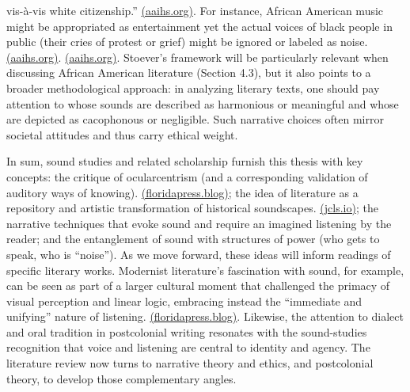 \documentclass[12pt]{report}
\begin{document}
vis-à-vis white citizenship.” \href{https://www.aaihs.org/the-sonic-color-line-black-women-and-police-violence/#:~:text=aural%20border%20between%20white%20people,call%20the%20sonic%20color%20line}{(aaihs.org)}. For instance, African American music might be appropriated as entertainment yet the actual voices of black people in public (their cries of protest or grief) might be ignored or labeled as noise. \href{https://www.aaihs.org/the-sonic-color-line-black-women-and-police-violence/#:~:text=presence%20%20of%20a%20long,call%20the%20sonic%20color%20line}{(aaihs.org)}. \href{https://www.aaihs.org/the-sonic-color-line-black-women-and-police-violence/#:~:text=The%20patroller%E2%80%99s%20deliberate%20tone%20ensures,European%20musical%20concepts%20of%20the}{(aaihs.org)}. Stoever’s framework will be particularly relevant when discussing African American literature (Section 4.3), but it also points to a broader methodological approach: in analyzing literary texts, one should pay attention to whose sounds are described as harmonious or meaningful and whose are depicted as cacophonous or negligible. Such narrative choices often mirror societal attitudes and thus carry ethical weight.

In sum, sound studies and related scholarship furnish this thesis with key concepts: the critique of ocularcentrism (and a corresponding validation of auditory ways of knowing). \href{https://floridapress.blog/2018/12/04/modernist-soundscapes/#:~:text=These%20writers%20challenged%20ocularcentrism%2C%20the,the%20course%20of%20contemporary%20literature}{(floridapress.blog)}; the idea of literature as a repository and artistic transformation of historical soundscapes. \href{https://jcls.io/article/id/3583/#:~:text=sonic%20environments%20as%20he%20did,32%20in%20Snaith%202020%2C%2020}{(jcls.io)}; the narrative techniques that evoke sound and require an imagined listening by the reader; and the entanglement of sound with structures of power (who gets to speak, who is “noise”). As we move forward, these ideas will inform readings of specific literary works. Modernist literature’s fascination with sound, for example, can be seen as part of a larger cultural moment that challenged the primacy of visual perception and linear logic, embracing instead the “immediate and unifying” nature of listening. \href{https://floridapress.blog/2018/12/04/modernist-soundscapes/#:~:text=These%20writers%20challenged%20ocularcentrism%2C%20the,the%20course%20of%20contemporary%20literature}{(floridapress.blog)}. Likewise, the attention to dialect and oral tradition in postcolonial writing resonates with the sound-studies recognition that voice and listening are central to identity and agency. The literature review now turns to narrative theory and ethics, and postcolonial theory, to develop those complementary angles.
\end{document}
